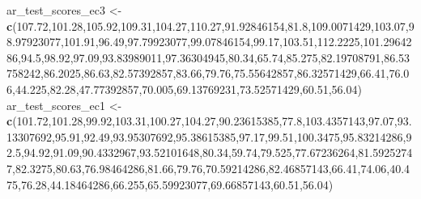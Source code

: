 \documentclass[
]{article}
\newenvironment{Shaded}{\begin{snugshade}}{\end{snugshade}}
\newcommand{\FloatTok}[1]{\textcolor[rgb]{0.00,0.00,0.81}{#1}}
\newcommand{\KeywordTok}[1]{\textcolor[rgb]{0.13,0.29,0.53}{\textbf{#1}}}
\newcommand{\NormalTok}[1]{#1}
\newcommand{\StringTok}[1]{\textcolor[rgb]{0.31,0.60,0.02}{#1}}
\begin{document}
\begin{Shaded}
\begin{Highlighting}[]
\NormalTok{ar_test_scores_ec3 <-}\StringTok{ }\KeywordTok{c}\NormalTok{(}\FloatTok{107.72}\NormalTok{,}\FloatTok{101.28}\NormalTok{,}\FloatTok{105.92}\NormalTok{,}\FloatTok{109.31}\NormalTok{,}\FloatTok{104.27}\NormalTok{,}\FloatTok{110.27}\NormalTok{,}\FloatTok{91.92846154}\NormalTok{,}\FloatTok{81.8}\NormalTok{,}\FloatTok{109.0071429}\NormalTok{,}\FloatTok{103.07}\NormalTok{,}\FloatTok{98.97923077}\NormalTok{,}\FloatTok{101.91}\NormalTok{,}\FloatTok{96.49}\NormalTok{,}\FloatTok{97.79923077}\NormalTok{,}\FloatTok{99.07846154}\NormalTok{,}\FloatTok{99.17}\NormalTok{,}\FloatTok{103.51}\NormalTok{,}\FloatTok{112.2225}\NormalTok{,}\FloatTok{101.2964286}\NormalTok{,}\FloatTok{94.5}\NormalTok{,}\FloatTok{98.92}\NormalTok{,}\FloatTok{97.09}\NormalTok{,}\FloatTok{93.83989011}\NormalTok{,}\FloatTok{97.36304945}\NormalTok{,}\FloatTok{80.34}\NormalTok{,}\FloatTok{65.74}\NormalTok{,}\FloatTok{85.275}\NormalTok{,}\FloatTok{82.19708791}\NormalTok{,}\FloatTok{86.53758242}\NormalTok{,}\FloatTok{86.2025}\NormalTok{,}\FloatTok{86.63}\NormalTok{,}\FloatTok{82.57392857}\NormalTok{,}\FloatTok{83.66}\NormalTok{,}\FloatTok{79.76}\NormalTok{,}\FloatTok{75.55642857}\NormalTok{,}\FloatTok{86.32571429}\NormalTok{,}\FloatTok{66.41}\NormalTok{,}\FloatTok{76.06}\NormalTok{,}\FloatTok{44.225}\NormalTok{,}\FloatTok{82.28}\NormalTok{,}\FloatTok{47.77392857}\NormalTok{,}\FloatTok{70.005}\NormalTok{,}\FloatTok{69.13769231}\NormalTok{,}\FloatTok{73.52571429}\NormalTok{,}\FloatTok{60.51}\NormalTok{,}\FloatTok{56.04}\NormalTok{)}
\NormalTok{ar_test_scores_ec1 <-}\StringTok{ }\KeywordTok{c}\NormalTok{(}\FloatTok{101.72}\NormalTok{,}\FloatTok{101.28}\NormalTok{,}\FloatTok{99.92}\NormalTok{,}\FloatTok{103.31}\NormalTok{,}\FloatTok{100.27}\NormalTok{,}\FloatTok{104.27}\NormalTok{,}\FloatTok{90.23615385}\NormalTok{,}\FloatTok{77.8}\NormalTok{,}\FloatTok{103.4357143}\NormalTok{,}\FloatTok{97.07}\NormalTok{,}\FloatTok{93.13307692}\NormalTok{,}\FloatTok{95.91}\NormalTok{,}\FloatTok{92.49}\NormalTok{,}\FloatTok{93.95307692}\NormalTok{,}\FloatTok{95.38615385}\NormalTok{,}\FloatTok{97.17}\NormalTok{,}\FloatTok{99.51}\NormalTok{,}\FloatTok{100.3475}\NormalTok{,}\FloatTok{95.83214286}\NormalTok{,}\FloatTok{92.5}\NormalTok{,}\FloatTok{94.92}\NormalTok{,}\FloatTok{91.09}\NormalTok{,}\FloatTok{90.4332967}\NormalTok{,}\FloatTok{93.52101648}\NormalTok{,}\FloatTok{80.34}\NormalTok{,}\FloatTok{59.74}\NormalTok{,}\FloatTok{79.525}\NormalTok{,}\FloatTok{77.67236264}\NormalTok{,}\FloatTok{81.59252747}\NormalTok{,}\FloatTok{82.3275}\NormalTok{,}\FloatTok{80.63}\NormalTok{,}\FloatTok{76.98464286}\NormalTok{,}\FloatTok{81.66}\NormalTok{,}\FloatTok{79.76}\NormalTok{,}\FloatTok{70.59214286}\NormalTok{,}\FloatTok{82.46857143}\NormalTok{,}\FloatTok{66.41}\NormalTok{,}\FloatTok{74.06}\NormalTok{,}\FloatTok{40.475}\NormalTok{,}\FloatTok{76.28}\NormalTok{,}\FloatTok{44.18464286}\NormalTok{,}\FloatTok{66.255}\NormalTok{,}\FloatTok{65.59923077}\NormalTok{,}\FloatTok{69.66857143}\NormalTok{,}\FloatTok{60.51}\NormalTok{,}\FloatTok{56.04}\NormalTok{)}

\end{Highlighting}
\end{Shaded}
\end{document}
